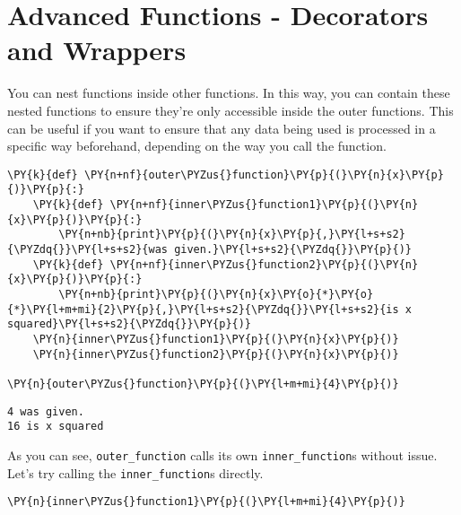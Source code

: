 \section{Advanced Functions - Decorators and Wrappers}
You can nest functions inside other functions. In this way, you can
contain these nested functions to ensure they're only accessible inside
the outer functions. This can be useful if you want to ensure that any
data being used is processed in a specific way beforehand, depending on
the way you call the function.

    \begin{tcolorbox}[breakable, size=fbox, boxrule=1pt, pad at break*=1mm,colback=cellbackground, colframe=cellborder]
\begin{Verbatim}[commandchars=\\\{\}]
\PY{k}{def} \PY{n+nf}{outer\PYZus{}function}\PY{p}{(}\PY{n}{x}\PY{p}{)}\PY{p}{:}
    \PY{k}{def} \PY{n+nf}{inner\PYZus{}function1}\PY{p}{(}\PY{n}{x}\PY{p}{)}\PY{p}{:}
        \PY{n+nb}{print}\PY{p}{(}\PY{n}{x}\PY{p}{,}\PY{l+s+s2}{\PYZdq{}}\PY{l+s+s2}{was given.}\PY{l+s+s2}{\PYZdq{}}\PY{p}{)}
    \PY{k}{def} \PY{n+nf}{inner\PYZus{}function2}\PY{p}{(}\PY{n}{x}\PY{p}{)}\PY{p}{:}
        \PY{n+nb}{print}\PY{p}{(}\PY{n}{x}\PY{o}{*}\PY{o}{*}\PY{l+m+mi}{2}\PY{p}{,}\PY{l+s+s2}{\PYZdq{}}\PY{l+s+s2}{is x squared}\PY{l+s+s2}{\PYZdq{}}\PY{p}{)}
    \PY{n}{inner\PYZus{}function1}\PY{p}{(}\PY{n}{x}\PY{p}{)}
    \PY{n}{inner\PYZus{}function2}\PY{p}{(}\PY{n}{x}\PY{p}{)}

\PY{n}{outer\PYZus{}function}\PY{p}{(}\PY{l+m+mi}{4}\PY{p}{)}
\end{Verbatim}
\end{tcolorbox}

    \begin{Verbatim}[commandchars=\\\{\}]
4 was given.
16 is x squared
    \end{Verbatim}

    As you can see, \texttt{outer\_function} calls its own
\texttt{inner\_function}s without issue. Let's try calling the
\texttt{inner\_function}s directly.

    \begin{tcolorbox}[breakable, size=fbox, boxrule=1pt, pad at break*=1mm,colback=cellbackground, colframe=cellborder]
\begin{Verbatim}[commandchars=\\\{\}]
\PY{n}{inner\PYZus{}function1}\PY{p}{(}\PY{l+m+mi}{4}\PY{p}{)}
\end{Verbatim}
\end{tcolorbox}

